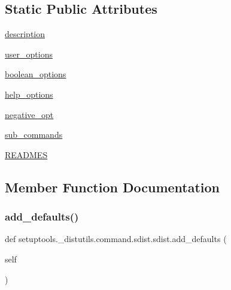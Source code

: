 \subsection*{Static Public Attributes}
\begin{DoxyCompactItemize}
\item 
\hyperlink{classsetuptools_1_1__distutils_1_1command_1_1sdist_1_1sdist_aca01010ae6088450b32e21e4ceba4216}{description}
\item 
\hyperlink{classsetuptools_1_1__distutils_1_1command_1_1sdist_1_1sdist_a966e4a7092cab76c78be835c47781c66}{user\+\_\+options}
\item 
\hyperlink{classsetuptools_1_1__distutils_1_1command_1_1sdist_1_1sdist_ae687a8b8642dcce5bd23b784659c2090}{boolean\+\_\+options}
\item 
\hyperlink{classsetuptools_1_1__distutils_1_1command_1_1sdist_1_1sdist_a32fbb4b35b3b7b8c0ab11a45c6fe8be8}{help\+\_\+options}
\item 
\hyperlink{classsetuptools_1_1__distutils_1_1command_1_1sdist_1_1sdist_ab6f8be444e97a9d7f115648353443581}{negative\+\_\+opt}
\item 
\hyperlink{classsetuptools_1_1__distutils_1_1command_1_1sdist_1_1sdist_ab6f5280998590a6ad15cd26111cd5709}{sub\+\_\+commands}
\item 
\hyperlink{classsetuptools_1_1__distutils_1_1command_1_1sdist_1_1sdist_a4f1a2fc98f938b4e4265904cd5901c16}{R\+E\+A\+D\+M\+ES}
\end{DoxyCompactItemize}


\subsection{Member Function Documentation}
\mbox{\label{classsetuptools_1_1__distutils_1_1command_1_1sdist_1_1sdist_a7e3e9e750e6e5f079000c3443afe18b1}} 
\subsubsection{\texorpdfstring{add\+\_\+defaults()}{add\_defaults()}}
{\footnotesize\ttfamily def setuptools.\+\_\+distutils.\+command.\+sdist.\+sdist.\+add\+\_\+defaults (\begin{DoxyParamCaption}\item[{}]{self }\end{DoxyParamCaption})}

